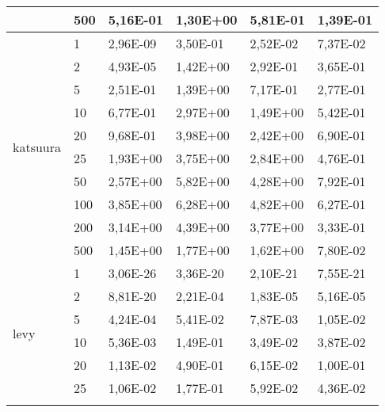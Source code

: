 \begin{longtable}[c]{|p{3.5cm}|l|l|l|l|l|}
                                        & 500       & 5,16E-01   & 1,30E+00   & 5,81E-01   & 1,39E-01  \\ \hline
\multirow[t]{10}{*}{katsuura}              & 1         & 2,96E-09   & 3,50E-01   & 2,52E-02   & 7,37E-02  \\ \cline{2-6} 
                                        & 2         & 4,93E-05   & 1,42E+00   & 2,92E-01   & 3,65E-01  \\ \cline{2-6} 
                                        & 5         & 2,51E-01   & 1,39E+00   & 7,17E-01   & 2,77E-01  \\ \cline{2-6} 
                                        & 10        & 6,77E-01   & 2,97E+00   & 1,49E+00   & 5,42E-01  \\ \cline{2-6} 
                                        & 20        & 9,68E-01   & 3,98E+00   & 2,42E+00   & 6,90E-01  \\ \cline{2-6} 
                                        & 25        & 1,93E+00   & 3,75E+00   & 2,84E+00   & 4,76E-01  \\ \cline{2-6} 
                                        & 50        & 2,57E+00   & 5,82E+00   & 4,28E+00   & 7,92E-01  \\ \cline{2-6} 
                                        & 100       & 3,85E+00   & 6,28E+00   & 4,82E+00   & 6,27E-01  \\ \cline{2-6} 
                                        & 200       & 3,14E+00   & 4,39E+00   & 3,77E+00   & 3,33E-01  \\ \cline{2-6} 
                                        & 500       & 1,45E+00   & 1,77E+00   & 1,62E+00   & 7,80E-02  \\ \hline
\multirow[t]{10}{*}{levy}                  & 1         & 3,06E-26   & 3,36E-20   & 2,10E-21   & 7,55E-21  \\ \cline{2-6} 
                                        & 2         & 8,81E-20   & 2,21E-04   & 1,83E-05   & 5,16E-05  \\ \cline{2-6} 
                                        & 5         & 4,24E-04   & 5,41E-02   & 7,87E-03   & 1,05E-02  \\ \cline{2-6} 
                                        & 10        & 5,36E-03   & 1,49E-01   & 3,49E-02   & 3,87E-02  \\ \cline{2-6} 
                                        & 20        & 1,13E-02   & 4,90E-01   & 6,15E-02   & 1,00E-01  \\ \cline{2-6} 
                                        & 25        & 1,06E-02   & 1,77E-01   & 5,92E-02   & 4,36E-02  \\ \cline{2-6} 

\end{longtable}
